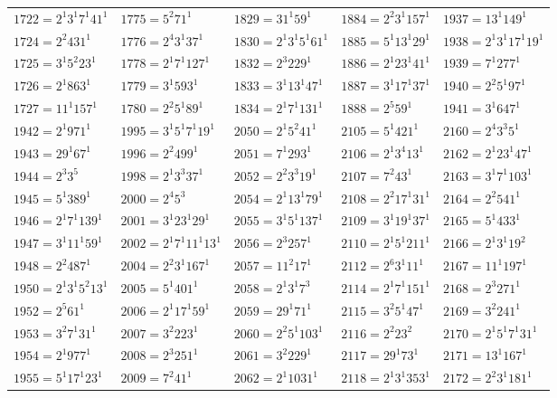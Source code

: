 {\begin{longtable}[c]{*{5}{l}}
$1722=2^{1}3^{1}7^{1}41^{1}$&$1775=5^{2}71^{1}$&$1829=31^{1}59^{1}$&$1884=2^{2}3^{1}157^{1}$&$1937=13^{1}149^{1}$\\
$1724=2^{2}431^{1}$&$1776=2^{4}3^{1}37^{1}$&$1830=2^{1}3^{1}5^{1}61^{1}$&$1885=5^{1}13^{1}29^{1}$&$1938=2^{1}3^{1}17^{1}19^{1}$\\
$1725=3^{1}5^{2}23^{1}$&$1778=2^{1}7^{1}127^{1}$&$1832=2^{3}229^{1}$&$1886=2^{1}23^{1}41^{1}$&$1939=7^{1}277^{1}$\\
$1726=2^{1}863^{1}$&$1779=3^{1}593^{1}$&$1833=3^{1}13^{1}47^{1}$&$1887=3^{1}17^{1}37^{1}$&$1940=2^{2}5^{1}97^{1}$\\
$1727=11^{1}157^{1}$&$1780=2^{2}5^{1}89^{1}$&$1834=2^{1}7^{1}131^{1}$&$1888=2^{5}59^{1}$&$1941=3^{1}647^{1}$\\
\pagebreak
$1942=2^{1}971^{1}$&$1995=3^{1}5^{1}7^{1}19^{1}$&$2050=2^{1}5^{2}41^{1}$&$2105=5^{1}421^{1}$&$2160=2^{4}3^{3}5^{1}$\\
$1943=29^{1}67^{1}$&$1996=2^{2}499^{1}$&$2051=7^{1}293^{1}$&$2106=2^{1}3^{4}13^{1}$&$2162=2^{1}23^{1}47^{1}$\\
$1944=2^{3}3^{5}$&$1998=2^{1}3^{3}37^{1}$&$2052=2^{2}3^{3}19^{1}$&$2107=7^{2}43^{1}$&$2163=3^{1}7^{1}103^{1}$\\
$1945=5^{1}389^{1}$&$2000=2^{4}5^{3}$&$2054=2^{1}13^{1}79^{1}$&$2108=2^{2}17^{1}31^{1}$&$2164=2^{2}541^{1}$\\
$1946=2^{1}7^{1}139^{1}$&$2001=3^{1}23^{1}29^{1}$&$2055=3^{1}5^{1}137^{1}$&$2109=3^{1}19^{1}37^{1}$&$2165=5^{1}433^{1}$\\
$1947=3^{1}11^{1}59^{1}$&$2002=2^{1}7^{1}11^{1}13^{1}$&$2056=2^{3}257^{1}$&$2110=2^{1}5^{1}211^{1}$&$2166=2^{1}3^{1}19^{2}$\\
$1948=2^{2}487^{1}$&$2004=2^{2}3^{1}167^{1}$&$2057=11^{2}17^{1}$&$2112=2^{6}3^{1}11^{1}$&$2167=11^{1}197^{1}$\\
$1950=2^{1}3^{1}5^{2}13^{1}$&$2005=5^{1}401^{1}$&$2058=2^{1}3^{1}7^{3}$&$2114=2^{1}7^{1}151^{1}$&$2168=2^{3}271^{1}$\\
$1952=2^{5}61^{1}$&$2006=2^{1}17^{1}59^{1}$&$2059=29^{1}71^{1}$&$2115=3^{2}5^{1}47^{1}$&$2169=3^{2}241^{1}$\\
$1953=3^{2}7^{1}31^{1}$&$2007=3^{2}223^{1}$&$2060=2^{2}5^{1}103^{1}$&$2116=2^{2}23^{2}$&$2170=2^{1}5^{1}7^{1}31^{1}$\\
$1954=2^{1}977^{1}$&$2008=2^{3}251^{1}$&$2061=3^{2}229^{1}$&$2117=29^{1}73^{1}$&$2171=13^{1}167^{1}$\\
$1955=5^{1}17^{1}23^{1}$&$2009=7^{2}41^{1}$&$2062=2^{1}1031^{1}$&$2118=2^{1}3^{1}353^{1}$&$2172=2^{2}3^{1}181^{1}$\\

\end{longtable}}
